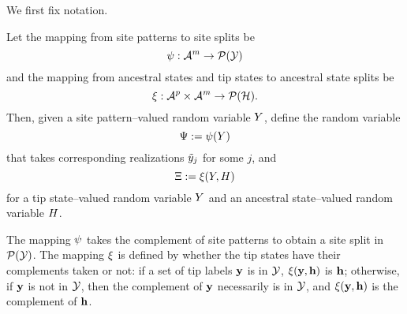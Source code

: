 We first fix notation.
\begin{definition}
Let the mapping from site patterns to site splits be
$$
\psi:\mathcal{A}^m\rightarrow\mathcal{P}(\mathcal{Y})
$$
and the mapping from ancestral states and tip states to ancestral state splits be
$$
\xi:\mathcal{A}^p\times\mathcal{A}^m\rightarrow\mathcal{P}(\mathcal{H}).
$$
Then, given a site pattern--valued random variable $Y$, define the random variable
$$
\Psi := \psi(Y)
$$
that takes corresponding realizations $\tilde{y}_j$ for some $j$, and
$$
\Xi := \xi(Y, H)
$$
for a tip state--valued random variable $Y$ and an ancestral state--valued random variable $H$.
\end{definition}
The mapping $\psi$ takes the complement of site patterns to obtain a site split in $\mathcal{P}(\mathcal{Y})$.
The mapping $\xi$ is defined by whether the tip states have their complements taken or not: if a set of tip labels $\mathbf{y}$ is in $\mathcal{Y}$, $\xi(\mathbf{y}, \mathbf{h})$ is $\mathbf{h}$; otherwise, if $\mathbf{y}$ is not in $\mathcal{Y}$, then the complement of $\mathbf{y}$ necessarily is in $\mathcal{Y}$, and $\xi(\mathbf{y}, \mathbf{h})$ is the complement of $\mathbf{h}$.

